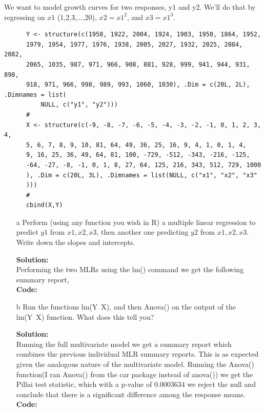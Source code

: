 \documentclass[12pt]{article}
\makeatletter
\theoremstyle{homework}
\newenvironment{exercise}[1]
{\def\@currentlabel{#1}\exercisecore}
{\endexercisecore}
\newcommand{\localhead}[1]{\par\smallskip\noindent\textbf{#1}\nobreak\\}%
\newcommand\solution{\localhead{Solution:}}
\makeatother
\begin{document}
\begin{exercise}{4} We want to model growth curves for two responses, y1 and y2.  
We'll do that by regressing on $x1$ (1,2,3,...,20), $x2 = x1^2$, and $x3 = x1^3$.
  \begin{footnotesize}
    \begin{verbatim}
      Y <- structure(c(1958, 1922, 2004, 1924, 1903, 1950, 1864, 1952, 
      1979, 1954, 1977, 1976, 1938, 2005, 2027, 1932, 2025, 2084, 2082, 
      2065, 1035, 987, 971, 966, 908, 881, 928, 999, 941, 944, 931, 898, 
      918, 971, 966, 998, 989, 993, 1060, 1030), .Dim = c(20L, 2L), .Dimnames = list(
          NULL, c("y1", "y2")))
      #
      X <- structure(c(-9, -8, -7, -6, -5, -4, -3, -2, -1, 0, 1, 2, 3, 4, 
      5, 6, 7, 8, 9, 10, 81, 64, 49, 36, 25, 16, 9, 4, 1, 0, 1, 4, 
      9, 16, 25, 36, 49, 64, 81, 100, -729, -512, -343, -216, -125, 
      -64, -27, -8, -1, 0, 1, 8, 27, 64, 125, 216, 343, 512, 729, 1000
      ), .Dim = c(20L, 3L), .Dimnames = list(NULL, c("x1", "x2", "x3"
      )))
      #
      cbind(X,Y)
    \end{verbatim}
  \end{footnotesize}

\begin{enumerate}
  \item[a] Perform (using any function you wish in R) 
  a multiple linear regression to predict $y1$ from $x1,x2,x3$, 
  then another one predicting $y2$ from $x1,x2,x3$.  
  Write down the slopes and intercepts.\\
  \solution  Performing the two MLRs using the lm() command we get the following summary report, \\
      \textbf{Code:}
        \begin{center}
        
        \end{center}
  




  
  \vspace{.15in}

  \item[b] Run the functions lm(Y~X), 
  and then Anova() on the output of the lm(Y~X) function.  
  What does this tell you?\\
  \solution Running the full multivariate model we get a summary report which combines the previous individual MLR summary reports. This is as expected given 
  the analogous nature of the multivariate model. Running the Anova() function(I ran Anova() from the car package instead of anova()) we get the Pillai test statistic, which 
  with a p-value of $0.0003634$ we reject the null and conclude that there is a significant difference among the response means.\\
    \textbf{Code:}
    \begin{center}
    
    \end{center}
  \vspace{.15in}



\end{enumerate}
\end{exercise}
\end{document}

